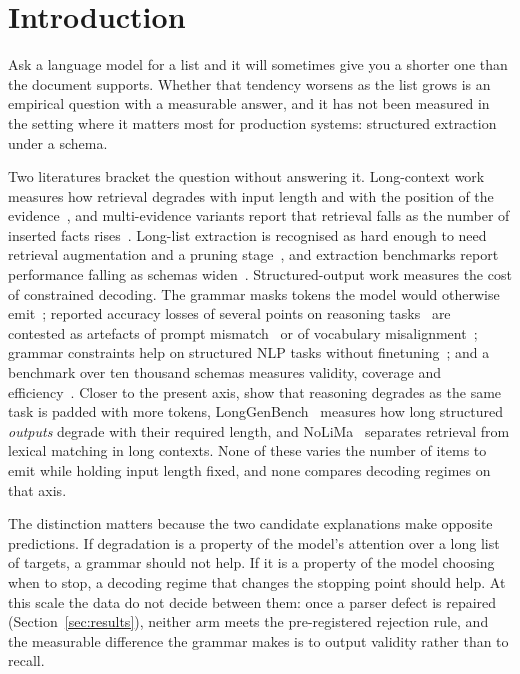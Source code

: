 \documentclass[11pt]{article}
\begin{document}
\section{Introduction}

Ask a language model for a list and it will sometimes give you a shorter one than
the document supports. Whether that tendency worsens as the list grows is an
empirical question with a measurable answer, and it has not been measured in the
setting where it matters most for production systems: structured extraction under
a schema.

Two literatures bracket the question without answering it. Long-context work
measures how retrieval degrades with input length and with the position of the
evidence~\citep{lostinmiddle,ruler,contextrot}, and multi-evidence variants
report that retrieval falls as the number of inserted facts
rises~\citep{multineedle,countingstars}. Long-list extraction is recognised as
hard enough to need retrieval augmentation and a pruning
stage~\citep{recallthemall}, and extraction benchmarks report performance
falling as schemas widen~\citep{extractbench}. Structured-output work measures
the cost of constrained decoding. The grammar masks tokens the model would
otherwise emit~\citep{outlines}; reported accuracy losses of several points on
reasoning tasks~\citep{letmespeak} are contested as artefacts of prompt
mismatch~\citep{saywhatyoumean} or of vocabulary
misalignment~\citep{domino}; grammar constraints help on structured NLP tasks
without finetuning~\citep{gcd2023}; and a benchmark over ten thousand schemas
measures validity, coverage and efficiency~\citep{jsonschemabench}. Closer to the present axis, \citet{sametask} show that reasoning
degrades as the same task is padded with more tokens, LongGenBench~\citep{longgenbench}
measures how long structured \emph{outputs} degrade with their required length,
and NoLiMa~\citep{nolima} separates retrieval from lexical matching in long
contexts. None of these varies the number of items to emit while holding input
length fixed, and none compares decoding regimes on that axis.

The distinction matters because the two candidate explanations make opposite
predictions. If degradation is a property of the model's attention over a long
list of targets, a grammar should not help. If it is a property of the model
choosing when to stop, a decoding regime that changes the stopping point should
help. At this scale the data do not decide between them: once a parser defect
is repaired (Section~\ref{sec:results}), neither arm meets the pre-registered
rejection rule, and the measurable difference the grammar makes is to output
validity rather than to recall.
\end{document}
